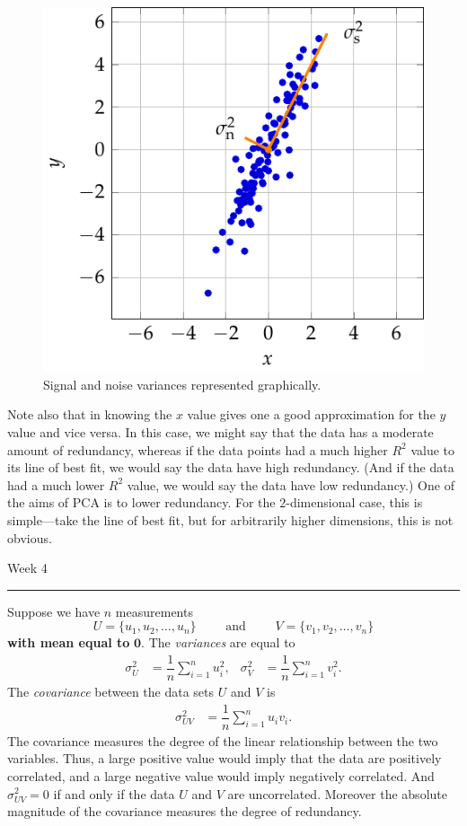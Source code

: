 \documentclass[a4paper, 12pt]{article}
\numberwithin{equation}{section}
\numberwithin{figure}{section}
\theoremstyle{definition}
\newcommand{\WEEK}[1]{%
\hfill Week #1

\vspace{-1em}

\begin{center}
	\rule{\textwidth}{2pt}
\end{center}
\vspace{0.5em}%
}
\begin{document}
\begin{figure}[h]
    \centering
    \includegraphics{graphics/pca_example2.pdf}
    \caption{Signal and noise variances represented graphically.}
	\label{fig:pca-example2}
\end{figure}

Note also that in  knowing the $x$ value gives one a good
approximation for the $y$ value and vice versa. In this case, we might say that
the data has a moderate amount of redundancy, whereas if the data points had a
much higher $R^2$ value to its line of best fit, we would say the data have high
redundancy. (And if the data had a much lower $R^2$ value, we would say the data
have low redundancy.) One of the aims of PCA is to lower redundancy. For the
$2$-dimensional case, this is simple---take the line of best fit, but for
arbitrarily higher dimensions, this is not obvious. 

\WEEK{4}


Suppose we have $n$ measurements 
\[ 
	U = \{u_1, u_2, \dots, u_n\} \qquad \text{ and } \qquad V = \{v_1, v_2, \dots, v_n\}
\] 
\textbf{with mean equal to} $\mathbf{0}$. The \textit{variances} are equal to 
\begin{align*} 
	\sigma_U^2 &= \dfrac{1}{n} \sum_{i=1}^n u_i^2, & \sigma_V^2 &= \dfrac{1}{n} \sum_{i=1}^n v_i^2 .
\end{align*} 
The \textit{covariance} between the data sets $U$ and $V$ is 
\begin{align*}
	\sigma_{UV}^2 &= \dfrac{1}{n} \sum_{i=1}^n u_iv_i.
\end{align*}
The covariance measures the degree of the linear relationship between the two
variables. Thus, a large positive value would imply that the data are positively
correlated, and a large negative value would imply negatively correlated. And
$\sigma_{UV}^2= 0$ if and only if the data $U$ and $V$ are uncorrelated.
Moreover the absolute magnitude of the covariance measures the degree of
redundancy. 
\end{document}
